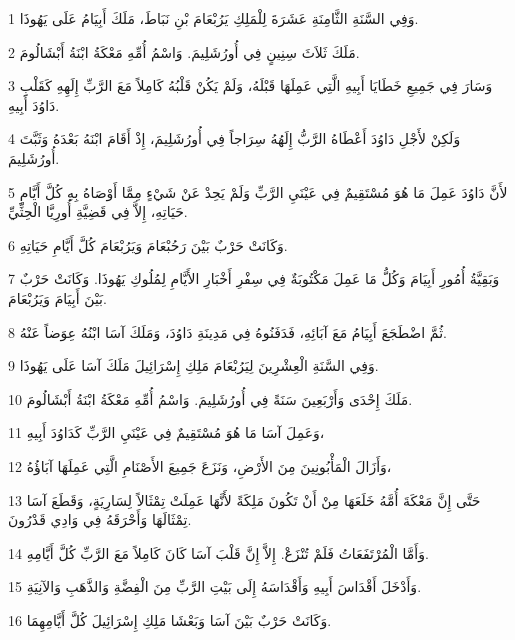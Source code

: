 \par 1 وَفِي السَّنَةِ الثَّامِنَةِ عَشَرَةَ لِلْمَلِكِ يَرُبْعَامَ بْنِ نَبَاطَ، مَلَكَ أَبِيَامُ عَلَى يَهُوذَا.
\par 2 مَلَكَ ثَلاَثَ سِنِينٍ فِي أُورُشَلِيمَ. وَاسْمُ أُمِّهِ مَعْكَةُ ابْنَةُ أَبْشَالُومَ.
\par 3 وَسَارَ فِي جَمِيعِ خَطَايَا أَبِيهِ الَّتِي عَمِلَهَا قَبْلَهُ، وَلَمْ يَكُنْ قَلْبُهُ كَامِلاً مَعَ الرَّبِّ إِلَهِهِ كَقَلْبِ دَاوُدَ أَبِيهِ.
\par 4 وَلَكِنْ لأَجْلِ دَاوُدَ أَعْطَاهُ الرَّبُّ إِلَهُهُ سِرَاجاً فِي أُورُشَلِيمَ، إِذْ أَقَامَ ابْنَهُ بَعْدَهُ وَثَبَّتَ أُورُشَلِيمَ.
\par 5 لأَنَّ دَاوُدَ عَمِلَ مَا هُوَ مُسْتَقِيمٌ فِي عَيْنَيِ الرَّبِّ وَلَمْ يَحِدْ عَنْ شَيْءٍ مِمَّا أَوْصَاهُ بِهِ كُلَّ أَيَّامِ حَيَاتِهِ، إِلاَّ فِي قَضِيَّةِ أُورِيَّا الْحِثِّيِّ.
\par 6 وَكَانَتْ حَرْبٌ بَيْنَ رَحُبْعَامَ وَيَرُبْعَامَ كُلَّ أَيَّامِ حَيَاتِهِ.
\par 7 وَبَقِيَّةُ أُمُورِ أَبِيَامَ وَكُلُّ مَا عَمِلَ مَكْتُوبَةٌ فِي سِفْرِ أَخْبَارِ الأَيَّامِ لِمُلُوكِ يَهُوذَا. وَكَانَتْ حَرْبٌ بَيْنَ أَبِيَامَ وَيَرُبْعَامَ.
\par 8 ثُمَّ اضْطَجَعَ أَبِيَامُ مَعَ آبَائِهِ، فَدَفَنُوهُ فِي مَدِينَةِ دَاوُدَ، وَمَلَكَ آسَا ابْنُهُ عِوَضاً عَنْهُ.
\par 9 وَفِي السَّنَةِ الْعِشْرِينَ لِيَرُبْعَامَ مَلِكِ إِسْرَائِيلَ مَلَكَ آسَا عَلَى يَهُوذَا.
\par 10 مَلَكَ إِحْدَى وَأَرْبَعِينَ سَنَةً فِي أُورُشَلِيمَ. وَاسْمُ أُمِّهِ مَعْكَةُ ابْنَةُ أَبْشَالُومَ.
\par 11 وَعَمِلَ آسَا مَا هُوَ مُسْتَقِيمٌ فِي عَيْنَيِ الرَّبِّ كَدَاوُدَ أَبِيهِ،
\par 12 وَأَزَالَ الْمَأْبُونِينَ مِنَ الأَرْضِ، وَنَزَعَ جَمِيعَ الأَصْنَامِ الَّتِي عَمِلَهَا آبَاؤُهُ،
\par 13 حَتَّى إِنَّ مَعْكَةَ أُمَّهُ خَلَعَهَا مِنْ أَنْ تَكُونَ مَلِكَةً لأَنَّهَا عَمِلَتْ تِمْثَالاً لِسَارِيَةٍ، وَقَطَعَ آسَا تِمْثَالَهَا وَأَحْرَقَهُ فِي وَادِي قَدْرُونَ.
\par 14 وَأَمَّا الْمُرْتَفَعَاتُ فَلَمْ تُنْزَعْ. إِلاَّ إِنَّ قَلْبَ آسَا كَانَ كَامِلاً مَعَ الرَّبِّ كُلَّ أَيَّامِهِ.
\par 15 وَأَدْخَلَ أَقْدَاسَ أَبِيهِ وَأَقْدَاسَهُ إِلَى بَيْتِ الرَّبِّ مِنَ الْفِضَّةِ وَالذَّهَبِ وَالآنِيَةِ.
\par 16 وَكَانَتْ حَرْبٌ بَيْنَ آسَا وَبَعْشَا مَلِكِ إِسْرَائِيلَ كُلَّ أَيَّامِهِمَا.
